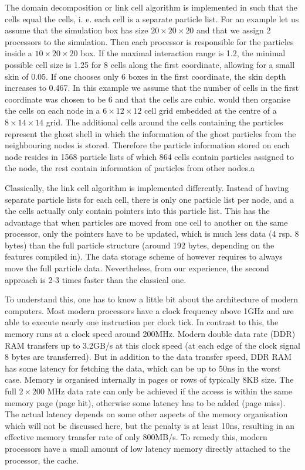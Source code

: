 The domain decomposition or link cell algorithm is implemented in
\es{} such that the cells equal the \es{} cells, i. e. each cell is a
separate particle list. For an example let us assume that the
simulation box has size $20\times 20\times 20$ and that we assign 2
processors to the simulation. Then each processor is responsible for
the particles inside a $10\times 20\times 20$ box. If the maximal
interaction range is 1.2, the minimal possible cell size is 1.25 for 8
cells along the first coordinate, allowing for a small skin of 0.05.
If one chooses only 6 boxes in the first coordinate, the skin depth
increases to 0.467. In this example we assume that the number of cells
in the first coordinate was chosen to be 6 and that the cells are
cubic. \es{} would then organise the cells on each node in a $6\times
12\times 12$ cell grid embedded at the centre of a $8\times 14 \times
14$ grid. The additional cells around the cells containing the
particles represent the ghost shell in which the information of the
ghost particles from the neighbouring nodes is stored. Therefore the
particle information stored on each node resides in 1568 particle
lists of which 864 cells contain particles assigned to the node, the
rest contain information of particles from other nodes.a

Classically, the link cell algorithm is implemented differently.
Instead of having separate particle lists for each cell, there is only
one particle list per node, and a the cells actually only contain
pointers into this particle list. This has the advantage that when
particles are moved from one cell to another on the same processor,
only the pointers have to be updated, which is much less data (4 rsp.
8 bytes) than the full particle structure (around 192 bytes, depending
on the features compiled in). The data storage scheme of \es{} however
requires to always move the full particle data. Nevertheless, from our
experience, the second approach is 2-3 times faster than the classical
one.

To understand this, one has to know a little bit about the
architecture of modern computers. Most modern processors have a clock
frequency above 1GHz and are able to execute nearly one instruction
per clock tick. In contrast to this, the memory runs at a clock speed
around 200MHz. Modern double data rate (DDR) RAM transfers up to
3.2GB/s at this clock speed (at each edge of the clock signal 8 bytes
are transferred). But in addition to the data transfer speed, DDR RAM
has some latency for fetching the data, which can be up to 50ns in the
worst case. Memory is organised internally in pages or rows of
typically 8KB size. The full $2\times 200$ MHz data rate can only be
achieved if the access is within the same memory page (page hit),
otherwise some latency has to be added (page miss). The actual latency
depends on some other aspects of the memory organisation which will
not be discussed here, but the penalty is at least 10ns, resulting in
an effective memory transfer rate of only 800MB/s. To remedy this,
modern processors have a small amount of low latency memory directly
attached to the processor, the cache.

